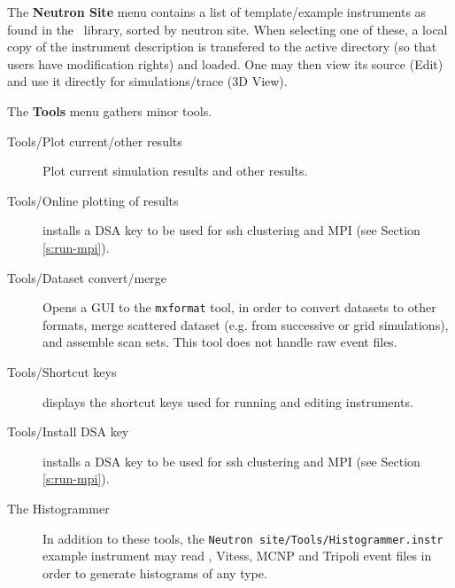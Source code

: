\noindent The {\bfseries Neutron Site} menu contains a list of
template/example instruments as found in the \MCX\ library, sorted by
neutron site. When selecting one of these, a local copy of the
instrument description is transfered to the active directory (so that
users have modification rights) and loaded. One may then view its source (Edit) and use it directly for simulations/trace (3D View).


\noindent The {\bfseries Tools} menu gathers minor tools.
\begin{description}
\item[Tools/Plot current/other results] Plot current simulation results and other results.
\item[Tools/Online plotting of results] installs a DSA key to be used for ssh clustering and MPI (see Section \ref{s:run-mpi}).
\item[Tools/Dataset convert/merge] Opens a GUI to the \verb+mxformat+ tool, in order to convert datasets to other formats, merge scattered dataset (e.g. from successive or grid simulations), and assemble scan sets. This tool does not handle raw event files.
\item[Tools/Shortcut keys] displays the shortcut keys used for running and editing instruments.
\item[Tools/Install DSA key] installs a DSA key to be used for ssh clustering and MPI (see Section \ref{s:run-mpi}).
\item[The Histogrammer] In addition to these tools, the \verb+Neutron site/Tools/Histogrammer.instr+ example instrument may read \MCX , Vitess, MCNP and Tripoli event files in order to generate histograms of any type.
\end{description}


